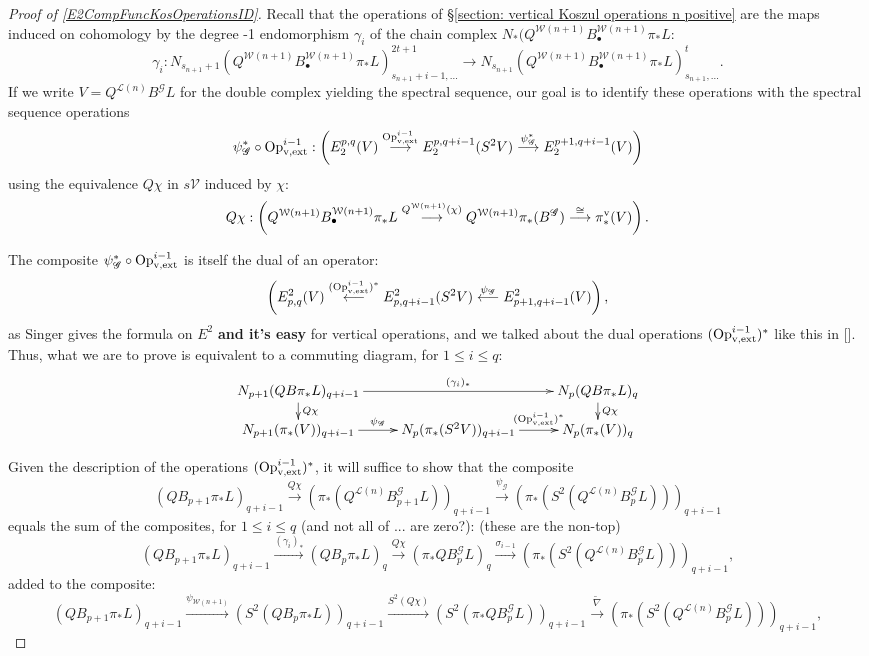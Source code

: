\documentclass[11pt]{amsart}
\theoremstyle{plain}
\theoremstyle{definition}
\renewcommand{\to}{\longrightarrow}
\newcommand{\from}{\longleftarrow}
\newcommand{\scrG}{\mathscr{G}}
\newcommand{\calW}{\mathcal{W}}
\newcommand{\calL}{\mathcal{L}}
\newcommand{\calV}{\mathcal{V}}
\theoremstyle{plain}
\newcommand{\BSW}{{\scrG}}
\newcommand{\BSWres}{B^\BSW}%
\newcommand{\vExtCohOp}{\textup{Op}_\textup{v,ext}}
\begin{document}
\begin{Composite functor spectral sequences}
\begin{tricky proofs of operation compatibilities}
\begin{proof}[Proof of \ref{E2CompFuncKosOperationsID}]
Recall that the operations of \S\ref{section: vertical Koszul operations n positive} are the maps induced on cohomology by the degree -1 endomorphism $\gamma_i$ of the chain complex $N_*(Q^{\calW(n+1)} B^{\calW(n+1)}_{\bullet}\pi_*L$:
\[\gamma_i:N_{s_{n+1}+1}(Q^{\calW(n+1)} B^{\calW(n+1)}_{\bullet}\pi_*L)^{2t+1}_{s_{n+1}+i-1,\ldots}\to N_{s_{n+1}}(Q^{\calW(n+1)} B^{\calW(n+1)}_{\bullet}\pi_*L)^{t}_{s_{n+1},\ldots}.\]
If we write $V=Q^{\calL(n)}\BSWres L$ for the double complex yielding the spectral sequence, our goal is to identify these operations with the spectral sequence operations
\[\psi_{\BSW}^*\circ\vExtCohOp^{i-1}:\left(E^{p,q}_2(V)\overset{\vExtCohOp^{i-1}}{\to} E^{p,q+i-1}_2(S^2V)\overset{\psi_{\BSW}^*}{\to}E^{p+1,q+i-1}_2(V)\right)\]
using the equivalence $Q\chi$ in $s\calV$ induced by $\chi$:%
\[Q\chi:\left(Q^{\calW(n+1)}B^{\calW(n+1)}_{\bullet} \pi_*L\overset{Q^{\calW(n+1)}(\chi)}{\to} Q^{\calW(n+1)}\pi_*(\BSWres )\overset{\cong }{\to}\pi_*^\textup{v}(V)\right).\]

The composite $\psi_{\BSW}^*\circ\vExtCohOp^{i-1}$ is itself the dual of an operator:
\[\left(E_{p,q}^2(V)\overset{(\vExtCohOp^{i-1})^*}{\from} E_{p,q+i-1}^2(S^2V)\overset{\psi_{\BSW}}{\from}E_{p+1,q+i-1}^2(V)\right),\]
as Singer gives the formula on $E^2$ \textbf{and it's easy} for vertical operations, and we talked about the dual operations $(\vExtCohOp^{i-1})^*$ like this in []. Thus, what we are to prove is equivalent to a commuting diagram, for $1\leq i\leq q$:
\[\xymatrix@R=4mm{
N_{p+1}(QB\pi_*L)_{q+i-1}\ar[rr]^-{(\gamma_i)_*}
\ar[d]^-{Q\chi}
&%
&%
N_p(QB\pi_*L)_q\ar[d]^-{Q\chi}
\\%
N_{p+1}(\pi_*(V))_{q+i-1}\ar[r]^-{\psi_{\BSW}}
&%
N_{p}(\pi_*(S^2V))_{q+i-1}\ar[r]^-{(\vExtCohOp^{i-1})^*}
&%
N_p(\pi_*(V))_q%
}\]

Given the description of the operations $(\vExtCohOp^{i-1})^*$, it will suffice to show that the composite
\[(QB_{p+1}\pi_*L)_{q+i-1}\overset{Q\chi}{\to}(\pi_*(Q^{\calL(n)}\BSWres_{p+1}L))_{q+i-1}\overset{\psi_{\BSW}}{\to}(\pi_*(S^2(Q^{\calL(n)}\BSWres_pL)))_{q+i-1}\]
equals the sum of the composites, for $1\leq i \leq q$ (and not all of ... are zero?): (these are the non-top)
\[(QB_{p+1}\pi_* L)_{q+i-1}\overset{(\gamma_i)_*}{\to} (QB_{p}\pi_* L)_q\overset{Q\chi}{\to} (\pi_*Q\BSWres_{p}L)_q\overset{\sigma_{i-1}}{\to} (\pi_*(S^2(Q^{\calL(n)}\BSWres_{p}L)))_{q+i-1},\]
added to the composite:
\[(QB_{p+1}\pi_* L)_{q+i-1}\overset{\psi_{\calW(n+1)}}{\to}(S^2(QB_{p}\pi_* L))_{q+i-1}\overset{S^2(Q\chi)}{\to}
(S^2(\pi_*Q\BSWres_pL))_{q+i-1}\overset{\widetilde{\nabla}}{\to}
(\pi_*(S^2(Q^{\calL(n)}\BSWres_{p}L)))_{q+i-1},\]



\end{proof}
\end{tricky proofs of operation compatibilities}
\end{Composite functor spectral sequences}
\end{document}
